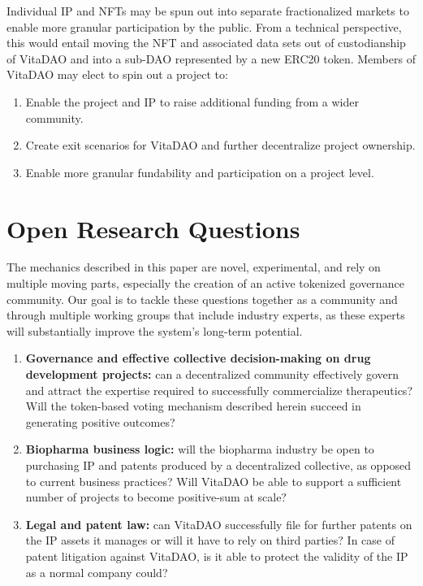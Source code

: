 \documentclass[12pt,letterpaper]{article}
\begin{document}
Individual IP and NFTs may be spun out into separate fractionalized markets to enable more granular participation by the public. From a technical perspective, this would entail moving the NFT and associated data sets out of custodianship of VitaDAO and into a sub-DAO represented by a new ERC20 token. Members of VitaDAO may elect to spin out a project to:
\begin{enumerate}
\item Enable the project and IP to raise additional funding from a wider community.
\item Create exit scenarios for VitaDAO and further decentralize project ownership.
\item Enable more granular fundability and participation on a project level.
\end{enumerate}

\section{Open Research Questions}
The mechanics described in this paper are novel, experimental, and rely on multiple moving parts, especially the creation of an active tokenized governance community. Our goal is to tackle these questions together as a community and through multiple working groups that include industry experts, as these experts will substantially improve the system’s long-term potential.
\begin{enumerate}
\item \textbf{Governance and effective collective decision-making on drug development projects:} can a decentralized community effectively govern and attract the expertise required to successfully commercialize therapeutics? Will the token-based voting mechanism described herein succeed in generating positive outcomes?
\item \textbf{Biopharma business logic:} will the biopharma industry be open to purchasing IP and patents produced by a decentralized collective, as opposed to current business practices? Will VitaDAO be able to support a sufficient number of projects to become positive-sum at scale?
\item \textbf{Legal and patent law:} can VitaDAO successfully file for further patents on the IP assets it manages or will it have to rely on third parties? In case of patent litigation against VitaDAO, is it able to protect the validity of the IP as a normal company could?
\end{enumerate}
\end{document}
